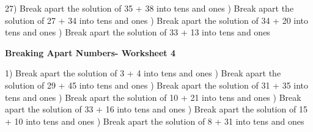 \documentclass{article}%
\begin{document}
27) Break apart the solution of 35 + 38 into tens and ones%
\newline%
\newline%
) Break apart the solution of 27 + 34 into tens and ones%
\newline%
\newline%
) Break apart the solution of 34 + 20 into tens and ones%
\newline%
\newline%
) Break apart the solution of 33 + 13 into tens and ones%
\newline%
\newline%
\newline%
\pagebreak%
\large%
\begin{center}%
\textbf{Breaking Apart Numbers- Worksheet 4}%
\newline%
\newline%
\newline%
\end{center} \normalsize%
1) Break apart the solution of 3 + 4 into tens and ones%
\newline%
\newline%
) Break apart the solution of 29 + 45 into tens and ones%
\newline%
\newline%
) Break apart the solution of 31 + 35 into tens and ones%
\newline%
\newline%
) Break apart the solution of 10 + 21 into tens and ones%
\newline%
\newline%
) Break apart the solution of 33 + 16 into tens and ones%
\newline%
\newline%
) Break apart the solution of 15 + 10 into tens and ones%
\newline%
\newline%
) Break apart the solution of 8 + 31 into tens and ones%
\newline%
\newline%
\newline%
\end{document}
